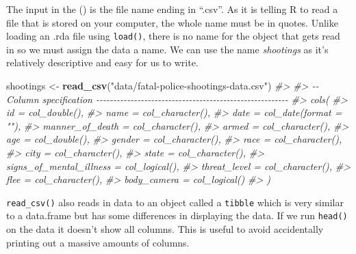 \documentclass[
  12pt,
]{book}
\newenvironment{Shaded}{\begin{snugshade}}{\end{snugshade}}
\newcommand{\CommentTok}[1]{\textcolor[rgb]{0.37,0.37,0.37}{\textit{#1}}}
\newcommand{\KeywordTok}[1]{\textcolor[rgb]{0.27,0.27,0.27}{\textbf{#1}}}
\newcommand{\NormalTok}[1]{#1}
\newcommand{\StringTok}[1]{\textcolor[rgb]{0.5,0.5,0.5}{#1}}
\begin{document}
The input in the () is the file name ending in ``.csv''. As it is telling R to read a file that is stored on your computer, the whole name must be in quotes. Unlike loading an .rda file using \texttt{load()}, there is no name for the object that gets read in so we must assign the data a name. We can use the name \emph{shootings} as it's relatively descriptive and easy for us to write.

\begin{Shaded}
\begin{Highlighting}[]
\NormalTok{shootings \textless{}{-}}\StringTok{ }\KeywordTok{read\_csv}\NormalTok{(}\StringTok{"data/fatal{-}police{-}shootings{-}data.csv"}\NormalTok{)}
\CommentTok{\#\textgreater{} }
\CommentTok{\#\textgreater{} {-}{-} Column specification {-}{-}{-}{-}{-}{-}{-}{-}{-}{-}{-}{-}{-}{-}{-}{-}{-}{-}{-}{-}{-}{-}{-}{-}{-}{-}{-}{-}{-}{-}{-}{-}{-}{-}{-}{-}{-}{-}{-}{-}{-}{-}{-}{-}{-}{-}{-}{-}{-}{-}{-}{-}{-}{-}{-}{-}}
\CommentTok{\#\textgreater{} cols(}
\CommentTok{\#\textgreater{}   id = col\_double(),}
\CommentTok{\#\textgreater{}   name = col\_character(),}
\CommentTok{\#\textgreater{}   date = col\_date(format = ""),}
\CommentTok{\#\textgreater{}   manner\_of\_death = col\_character(),}
\CommentTok{\#\textgreater{}   armed = col\_character(),}
\CommentTok{\#\textgreater{}   age = col\_double(),}
\CommentTok{\#\textgreater{}   gender = col\_character(),}
\CommentTok{\#\textgreater{}   race = col\_character(),}
\CommentTok{\#\textgreater{}   city = col\_character(),}
\CommentTok{\#\textgreater{}   state = col\_character(),}
\CommentTok{\#\textgreater{}   signs\_of\_mental\_illness = col\_logical(),}
\CommentTok{\#\textgreater{}   threat\_level = col\_character(),}
\CommentTok{\#\textgreater{}   flee = col\_character(),}
\CommentTok{\#\textgreater{}   body\_camera = col\_logical()}
\CommentTok{\#\textgreater{} )}
\end{Highlighting}
\end{Shaded}

\texttt{read\_csv()} also reads in data to an object called a \texttt{tibble} which is very similar to a data.frame but has some differences in displaying the data. If we run \texttt{head()} on the data it doesn't show all columns. This is useful to avoid accidentally printing out a massive amounts of columns.
\end{document}
